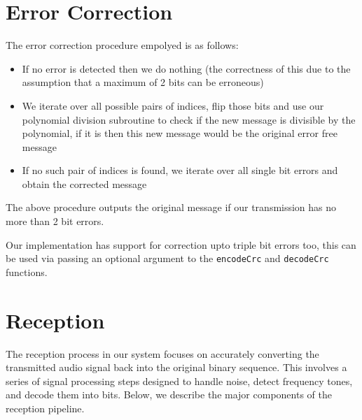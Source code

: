 \documentclass[11pt]{article}
\begin{document}
\section{Error Correction}
The error correction procedure empolyed is as follows:
\begin{itemize}
    \item If no error is detected then we do nothing (the correctness of this due to the assumption that a maximum of 2 bits can be erroneous)
    \item We iterate over all possible pairs of indices, flip those bits and use our polynomial division subroutine to check if the new message is divisible by the polynomial, if it is then this new message would be the original error free message
    \item If no such pair of indices is found, we iterate over all single bit errors and obtain the corrected message
\end{itemize}
The above procedure outputs the original message if our transmission has no more than 2 bit errors.
\begin{center}
\end{center}
\noindent Our implementation has support for correction upto triple bit errors too, this can be used via passing an optional argument to the \texttt{encodeCrc} and \texttt{decodeCrc} functions.
\section{Reception}

The reception process in our system focuses on accurately converting the transmitted audio signal back into the original binary sequence. This involves a series of signal processing steps designed to handle noise, detect frequency tones, and decode them into bits. Below, we describe the major components of the reception pipeline.
\end{document}
